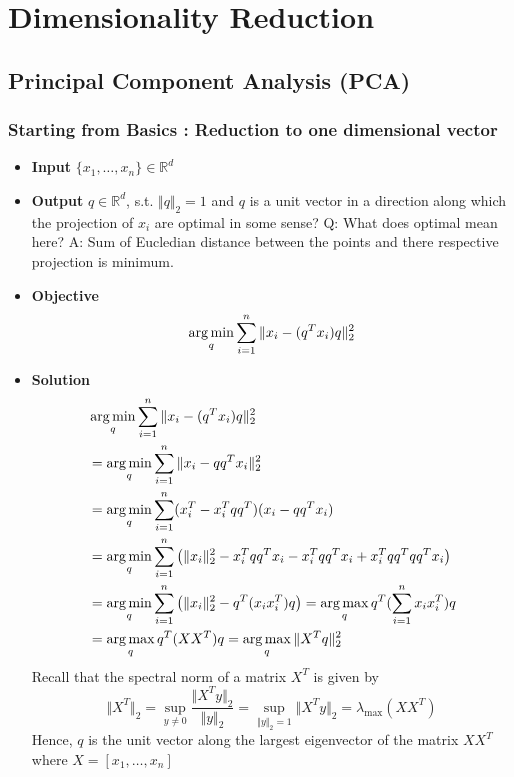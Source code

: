 \documentclass{article}
\begin{document}
\section{Dimensionality Reduction}


\subsection{Principal Component Analysis (PCA)}

\subsubsection{Starting from Basics : Reduction to one dimensional vector}
\begin{itemize}
    \item \textbf{Input} $\{x_1, \dots, x_n\} \in \mathbb{R}^d$
    \item \textbf{Output} $q \in \mathbb{R}^d$, s.t. $\Vert q \Vert_2=1$ and $q$ is a unit vector in a direction along which the projection of $x_i$ are optimal in some sense? Q: What does optimal mean here? A: Sum of Eucledian distance between the points and there respective projection is minimum.
    \item \textbf{Objective} 
        $$\operatorname*{arg\,min}_{q} \sum_{i=1}^n \Vert x_i - (q^Tx_i)q \Vert_2^2  $$
    \item \textbf{Solution} 
        \begin{align*}
            & \operatorname*{arg\,min}_{q} \sum_{i=1}^n \Vert x_i - (q^Tx_i)q \Vert_2^2 \\
            &= \operatorname*{arg\,min}_{q} \sum_{i=1}^n \Vert x_i - qq^Tx_i \Vert_2^2 \\
            &= \operatorname*{arg\,min}_{q} \sum_{i=1}^n (x_i^T - x_i^Tqq^T)(x_i - qq^Tx_i) \\
            &= \operatorname*{arg\,min}_{q} \sum_{i=1}^n \left( \Vert x_i \Vert_2^2 - x_i^Tqq^Tx_i - x_i^Tqq^Tx_i + x_i^Tqq^Tqq^Tx_i \right)\\
            &= \operatorname*{arg\,min}_{q} \sum_{i=1}^n \left( \Vert x_i \Vert_2^2 - q^T(x_ix_i^T)q \right)
            = \operatorname*{arg\,max}_{q} q^T( \sum_{i=1}^n x_ix_i^T)q\\
            &= \operatorname*{arg\,max}_{q} q^T( XX^T )q = \operatorname*{arg\,max}_{q} \Vert X^Tq \Vert_2^2
        \end{align*}
        Recall that the spectral norm of a matrix $X^T$ is given by
        $$\Vert X^T\Vert_2 = \sup_{y \neq 0} \frac{\Vert X^Ty \Vert_2}{\Vert y \Vert_2} = \sup_{\Vert y \Vert_2 = 1} \Vert X^Ty \Vert_2 = \lambda_{\text{max}}(XX^T)$$
        Hence, $q$ is the unit vector along the largest eigenvector of the matrix $XX^T$ where $X = [x_1, \dots, x_n]$
\end{itemize}
\end{document}
